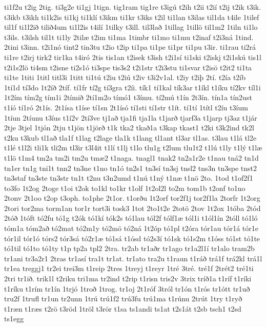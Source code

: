 {ti1f2u
t2ig
2tig.
ti3g2e
ti1gj
1tign.
tig1ram
tig1re
t3igú
t2ih
t2ii
t2ií
t2ij
t2ik
t3ik.
t3ikb
t3ikh
ti1k2is
ti1kj
ti1klí
t3ikm
ti1kr
t3iks
t2il
ti1lan
t3ilas
til1da
t4ile
1tilef
til1f
ti1l2ið
tilið4um
ti1l2is
t4ilí
1tilky
t3ill.
til3lað
1tillag
1tillö
til1m2
1tiln
ti1lo
t3ils.
t3ilsh
til1t
ti1ly
2tilæ
t2im
ti1ma
1timbr
ti1mo
ti1mu
t2inaf
t2i3ná
1tind.
2tini
t3inn.
t2i1nó
tint2
tin3tu
t2io
t2ip
ti1pa
ti1pe
ti1pr
ti1pu
t3ir.
ti1rau
ti2rá
ti1re
t2irj
tirk2
tir1ka
t4iró
2tis
tis1an
t2isek
t3ish
t2i1sí
ti1ski
t2iskj
t2i1skú
tis1l
t2i1s2lö
ti4sm
t2isne
ti2s1ó
ti3spe
tis3s2
t2i1str
t2i3stu
ti1svar
t2isö
t2it2
ti1ta
ti1te
1titi
1titl
titl3i
1titt
ti1tú
t2iu
t2iú
t2iv
t3i2v1al.
t2iy
t2iþ
2tí.
t2ía
t2íb
1tí1d
tí3do
1t2íð
2tíf.
tí1fr
tí2g
tí3gra
t2íi.
tík1
tí1kal
tík3ar
t1íkl
t1íku
tí2kv
tíl1i
1t2ím
tím2g
tím1i
2tímið
2tí1m2o
tímó1
t3ímu.
tí2mú
t1ín
2t3ín.
tín1a
tín2ust
t1íó
tí1ró
2t1ís.
2t1ísa
t1íse
tí1sn
2t1ísó
tí1sti
tí1str
t1ít.
tí1tí
1títl
t2íu
t3íum
1tíun
2tíunu
t3íus
t1í2v
2tí3ve
tj1að
tja1fi
tja1la
t1jarð
tjarf3a
t1jarp
tj3az
t1jár
2tje
3tjel
1tjón
2tju
t1jön
t1jörð
t1k
tka2
tkað1a
t3kap
tkast1
t2ki
t3k2ind
tk2l
t2ku
t3kub
tl1að
tla1f
t1lag
t2lage
tla1k
t1lang
tl1ant
tl3ar
tl1as.
t3lau
t1lá
tl2e
t1lé
t1l2i
tli1k
tli2m
tl3ir
t3l4it
t1lí
t1lj
t1lo
tlu1g
t2lum
tlu1t2
t1lú
t1ly
t1lý
t1læ
t1lö
t1m4
tm2a
tm2i
tm2u
tmæ2
t1naga.
tnagl1
tnak2
tn2a1r2e
t1nau
tná2
tn1d
tn1er
tn1g
tni1t
tnn2
tn3ne
t1no
tn1ó
tn2s1
tn3sí
tn3sj
tnsl2
tns3n
tn3spe
tnst2
tn3staf
tn3ste
tn3str
tn1t
t2nu
t3n2umd
t1nú
t1ný
t1næ
t1nö
2to.
1tod
t1of2f1
to3fo
1t2og
2toge
t1oi
t2ok
to1kl
to1kr
t1olf
1t2ol2l
to2m
tom1b
t2onf
to1no
2tonv
2t1oo
t2op
t3oph.
to1phe
2t1or.
t1orðu
1t2orf
tor2f1j
tor2f1la
2torfr
1t2org
2tori
tor2ma
torm1an
tor1r
tort3i
tosk3
1tot
2to1t2e
2totö
2tov
1t2ox
1tóba
2tód
2tóð
1tóft
tó2fu
tó1g
t2ók
tó1kí
tók2s
tó1lau
tól2f
tólf1æ
tól1i
t1ól1ín
2tóll
tó1ló
tóm1a
tóm2að
tó2mat
tó2m1y
tó2mö
tó2ná
1t2óp
tó1pl
t2óra
tór1au
tór1á
tór1e
tór1il
tór1ó
tórs2
tór3sá
tó2r1æ
tó1sá
t1ósd
tó2s3í
tó1sk
tó1s2m
t1óss
tó1st
tó1te
tó1til
tó1to
tó1ty
t1p
tp2a
tpl2
2tra.
tr2ab
tr1aðr
tr1ago
tr1a2l1í
tr1alo
tram2b
tr1ani
tr3a2r1
2tras
tr1así
tra1t
tr1at.
tr1ato
tra2u
t1raun
t1ráð
trá1f
trá2kl
trá1l
tr1ea
treggj1
tr2ei
trei3m
t1reip
2tres
1treyj
t1reyr
1tré
3tré.
tré1f
2trét2
tré1ti
2tri
tr1ið.
trik1l
t2riku
tri1ma
tr2ind
t2rip
t1risn
tris2v
3trix
tríð1a
t1ríf
t1ríki
t1ríku
t1rím
tr1ín
1trjó
1troð
1trog.
tr1oj
2t1róf
3tról
tr1ón
t1rós
tr1ótt
tr1uð
tru2f
1trufl
tr1un
tr2unn
1trú
trú1f2
trú3fu
trú1ma
t1rúnu
2trút
1try
t1ryð
t1ræn
t1ræs
t2rö
t3röd
1tröl
t3rör
t1sa
ts1andi
ts1at
t2s1át
t2sb
tsch1
t2sd
ts1egg
}
